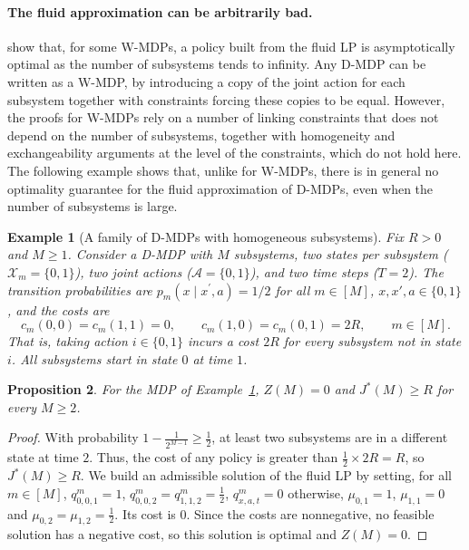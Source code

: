 \documentclass{article}
\newtheorem{proposition}{Proposition}
\newtheorem{example}[proposition]{Example}
\begin{document}
\paragraph{The fluid approximation can be arbitrarily bad.} \cite{BrownZhang2022, DAeth2023HospitalScheduling} show
that, for some W-MDPs, a policy built from the fluid LP is asymptotically optimal as the number of subsystems tends to
infinity. Any D-MDP can be written as a W-MDP, by introducing a copy of the joint action for each subsystem together
with constraints forcing these copies to be equal. However, the proofs for W-MDPs rely on a number of linking
constraints that does not depend on the number of subsystems, together with homogeneity and exchangeability arguments
at the level of the constraints, which do not hold here. The following example shows that, unlike for W-MDPs, there
is in general no optimality guarantee for the fluid approximation of D-MDPs, even when the number of subsystems is
large.

\begin{example}[A family of D-MDPs with homogeneous subsystems]
\label{ex:heterogeneous-mismatch}
Fix $R > 0$ and $M \geq 1$. Consider a D-MDP with $M$ subsystems, two states per subsystem ($\mathcal{X}_m = \{0,1\}$),
two joint actions ($\mathcal{A} = \{0,1\}$), and two time steps ($T=2$). The transition probabilities are
$p_m(x \mid x^{\prime}, a) = 1/2$ for all $m \in [M]$, $x, x', a \in \{0,1\}$, and the costs are
\[
    c_m(0,0) = c_m(1,1) = 0, \qquad c_m(1,0) = c_m(0,1) = 2R, \qquad m \in [M].
\]
That is, taking action $i \in \{0,1\}$ incurs a cost $2R$ for every subsystem not in state $i$. All subsystems start
in state $0$ at time $1$.
\end{example}

\begin{proposition}
\label{prop:arbitrary-large}
For the MDP of Example~\ref{ex:heterogeneous-mismatch}, $Z(M) = 0$ and $J^{*}(M) \ge R$ for every $M \geq 2$.
\end{proposition}

\begin{proof}
With probability $1 - \frac{1}{2^{M-1}} \geq \frac{1}{2}$, at least two subsystems are in a different state at time
$2$. Thus, the cost of any policy is greater than $\frac{1}{2} \times 2R = R$, so $J^*(M) \ge R$. We build an
admissible solution of the fluid LP by setting, for all $m \in [M]$, $q^m_{0,0,1} = 1$,
$q^m_{0,0,2} = q^m_{1,1,2} = \frac{1}{2}$, $q^m_{x,a,t} = 0$ otherwise, $\mu_{0,1} = 1$, $\mu_{1,1} = 0$ and
$\mu_{0,2} = \mu_{1,2} = \frac{1}{2}$. Its cost is $0$. Since the costs are nonnegative, no feasible solution has a
negative cost, so this solution is optimal and $Z(M) = 0$.
\end{proof}
\end{document}
